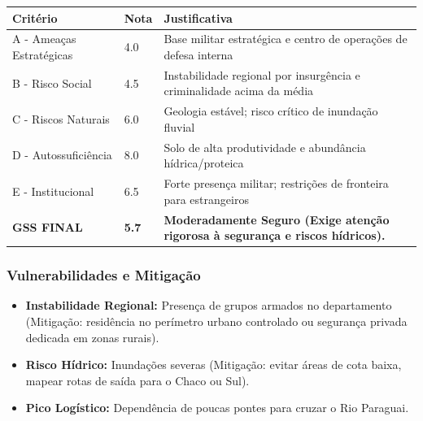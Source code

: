 \begin{table}[ht!]
\small \begin{tabular}{p{3.0cm}p{0.8cm}p{6.0cm}} \toprule
\textbf{Critério} & \textbf{Nota} & \textbf{Justificativa} \\ \midrule
A - Ameaças Estratégicas & 4.0 & Base militar estratégica e centro de operações de defesa interna \\
B - Risco Social & 4.5 & Instabilidade regional por insurgência e criminalidade acima da média \\
C - Riscos Naturais & 6.0 & Geologia estável; risco crítico de inundação fluvial \\
D - Autossuficiência & 8.0 & Solo de alta produtividade e abundância hídrica/\allowbreak \allowbreak proteica \\
E - Institucional & 6.5 & Forte presença militar; restrições de fronteira para estrangeiros \\
\midrule \textbf{GSS FINAL} & \textbf{5.7} & \textbf{Moderadamente Seguro (Exige atenção rigorosa à segurança e riscos hídricos).} \\ \bottomrule \end{tabular}
\end{table}
\subsubsection{Vulnerabilidades e
Mitigação}

\begin{itemize}
\tightlist
\item
  \textbf{Instabilidade Regional:} Presença de grupos armados no
  departamento (Mitigação: residência no perímetro urbano controlado ou
  segurança privada dedicada em zonas rurais).
\item
  \textbf{Risco Hídrico:} Inundações severas (Mitigação: evitar áreas de
  cota baixa, mapear rotas de saída para o Chaco ou Sul).
\item
  \textbf{Pico Logístico:} Dependência de poucas pontes para cruzar o
  Rio Paraguai.
\end{itemize}

